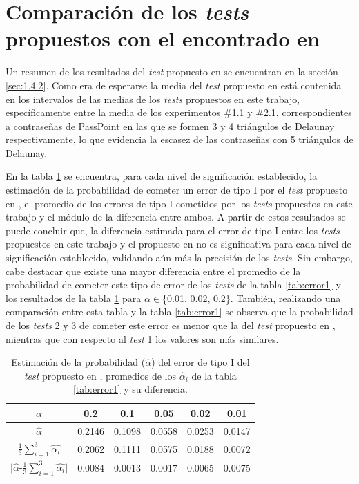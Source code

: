 \documentclass[12pt]{report}
\begin{document}
\section{Comparación de los \textit{tests} propuestos con el encontrado en  \cite{13}}
Un resumen de los resultados del \textit{test} propuesto en \cite{13} se encuentran en la sección \ref{sec:1.4.2}. Como era de esperarse la media del \textit{test} propuesto en \cite{13} está contenida en los intervalos de las medias de los \textit{tests} propuestos en este trabajo, específicamente entre la media de los experimentos \#1.1 y \#2.1, correspondientes a contraseñas de PassPoint en las que se formen 3 y 4 triángulos de Delaunay respectivamente, lo que evidencia la escasez de las contraseñas con 5 triángulos de Delaunay.

En la tabla \ref{tab:erro1-sensor} se encuentra, para cada nivel de significación establecido, la estimación de la probabilidad de cometer un error de tipo I por el \textit{test} propuesto en \cite{13}, el promedio de los errores de tipo I cometidos por los \textit{tests} propuestos en este trabajo y el módulo de la diferencia entre ambos.
A partir de estos resultados se puede concluir que, la diferencia estimada para el error de tipo I entre los \textit{tests} propuestos en este trabajo y el propuesto en \cite{13} no es significativa para cada nivel de significación
establecido, validando aún más la precisión de los \textit{tests}.  
Sin embargo, cabe destacar que existe una mayor diferencia entre el promedio de la probabilidad de cometer este tipo de error de los \textit{tests} de la tabla \ref{tab:error1} y los resultados de la tabla \ref{tab:erro1-sensor} para $\alpha \in$\{0.01, 0.02, 0.2\}. También, realizando una comparación entre esta tabla y la tabla \ref{tab:error1} se observa que la probabilidad de los \textit{tests} 2 y 3 de cometer este error es menor que la del \textit{test} propuesto en \cite{13}, mientras que con respecto al \textit{test} 1 los valores son más similares.

\begin{table}[h!]
	\centering
		\caption{Estimación de la probabilidad ($\hat{\alpha}$) del error de tipo I del \textit{test} propuesto en \cite{13}, promedios de los $\hat{\alpha}_i$ de la tabla \ref{tab:error1} y su diferencia.}
	\begin{tabular}{|c|ccccc|}
		\hline
		$\alpha$ &  0.2 & 0.1 & 0.05 & 0.02 & 0.01 \\
		\hline
		$\hat{\alpha}$ & 0.2146 & 0.1098 & 0.0558 & 0.0253 & 0.0147 \\
		$\frac{1}{3} \sum_{i=1}^{3} \hat{\alpha_i}$		
		&0.2062	&	0.1111	&	0.0575	&	0.0188	&0.0072	\\	
		\hline
		$|\hat{\alpha}$-$\frac{1}{3} \sum_{i=1}^{3} \hat{\alpha_i}|$ & 0.0084  & 0.0013 &  0.0017 &0.0065  &  0.0075 \\
		\hline
	\end{tabular}

	\label{tab:erro1-sensor}
\end{table}
\end{document}
